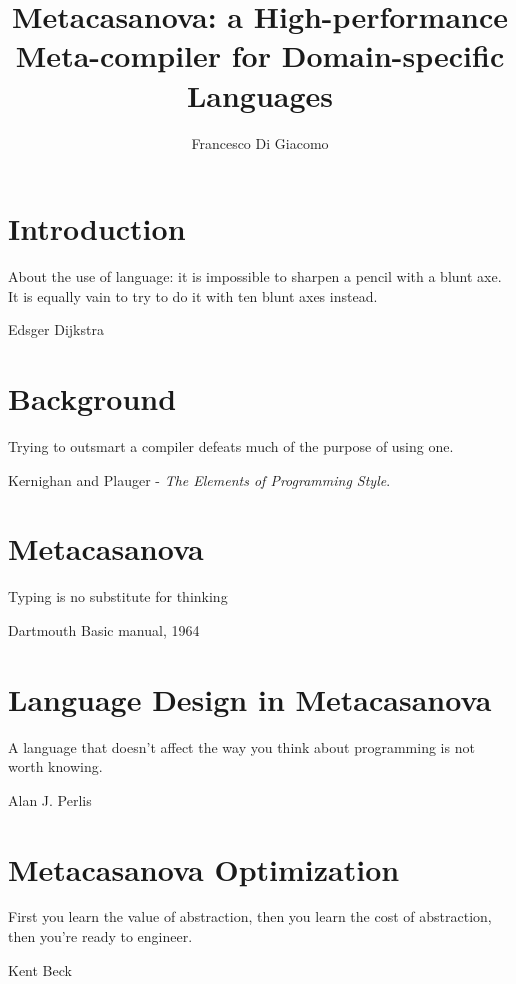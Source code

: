 \documentclass[9pt,b5paper,openright]{extbook}
\author{Francesco Di Giacomo}
\title{Metacasanova: a High-performance Meta-compiler for Domain-specific Languages}
\date { }
\theoremstyle{definition}
\begin{document}
\thispagestyle{empty}
\frontmatter
{} %



\newpage

\newpage
\tableofcontents

\mainmatter
{}
\chapter{Introduction}
\label{ch:introduction}
\epigraph{About the use of language: it is impossible to sharpen a pencil with a blunt axe. It is equally vain to try to do it with ten blunt axes instead.}{Edsger Dijkstra}

	

\chapter{Background}
\label{ch:background}
\epigraph{Trying to outsmart a compiler defeats much of the purpose of using one.}{Kernighan and Plauger - \textit{The Elements of Programming Style}.}

	
\chapter{Metacasanova}
\label{ch:metacasanova}
\epigraph{Typing is no substitute for thinking}{Dartmouth Basic manual, 1964}
		

\chapter{Language Design in Metacasanova}
\label{ch:languages}
\epigraph{A language that doesn't affect the way you think about programming is not worth knowing.}{Alan J. Perlis}


\chapter{Metacasanova Optimization}
\label{ch:functors}
\epigraph{First you learn the value of abstraction, then you learn the cost of abstraction, then you're ready to engineer.}{Kent Beck}

	
\end{document}
